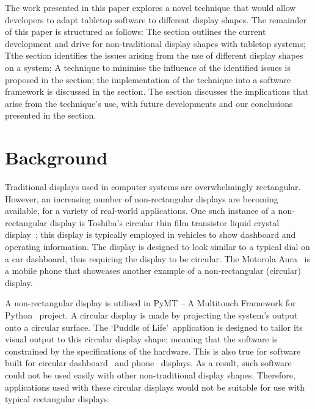 \documentclass{bmcart}
\begin{document}
The work presented in this paper explores a novel technique that would allow developers to adapt tabletop software to different display shapes.
The remainder of this paper is structured as follows: 
The  section outlines the current development and drive for non-traditional display shapes with tabletop systems;
Tthe  section identifies the issues arising from the use of different display shapes on a system;
A technique to minimise the influence of the identified issues is proposed in the  section;
the implementation of the technique into a software framework is discussed in the  section.
The  section discusses the implications that arise
from the technique's use, with future developments and our conclusions presented in the  section.

\section*{Background}
\label{sec:related}

Traditional displays used in computer systems are overwhelmingly rectangular.
However, an increasing number of non-rectangular displays are becoming available, for a variety of real-world applications.
One such instance of a non-rectangular display is Toshiba's circular
thin film transistor liquid crystal display~\cite{Boyd2007}; this display is typically employed in vehicles to show dashboard and operating information.
The display is designed to look similar to a typical dial on a car dashboard, thus requiring the display to be circular.
The Motorola Aura~\cite{Finney2009} is a mobile phone that showcases another example of a non-rectangular (circular) display.

A non-rectangular display is utilised in PyMT -- A Multitouch Framework for Python~\cite{Hansen2009} project.
A circular display is made by projecting the system's output onto a circular surface.
The \lq Puddle of Life\rq\ application is designed to tailor its visual output to this circular display shape; meaning that the software is constrained by the specifications of the hardware.
This is also true for software built for circular dashboard~\cite{Boyd2007} and phone~\cite{Finney2009} displays.
As a result, such software could not be used easily with other non-traditional display shapes.
Therefore, applications used with these circular displays would not be suitable for use with typical rectangular displays.
\end{document}
